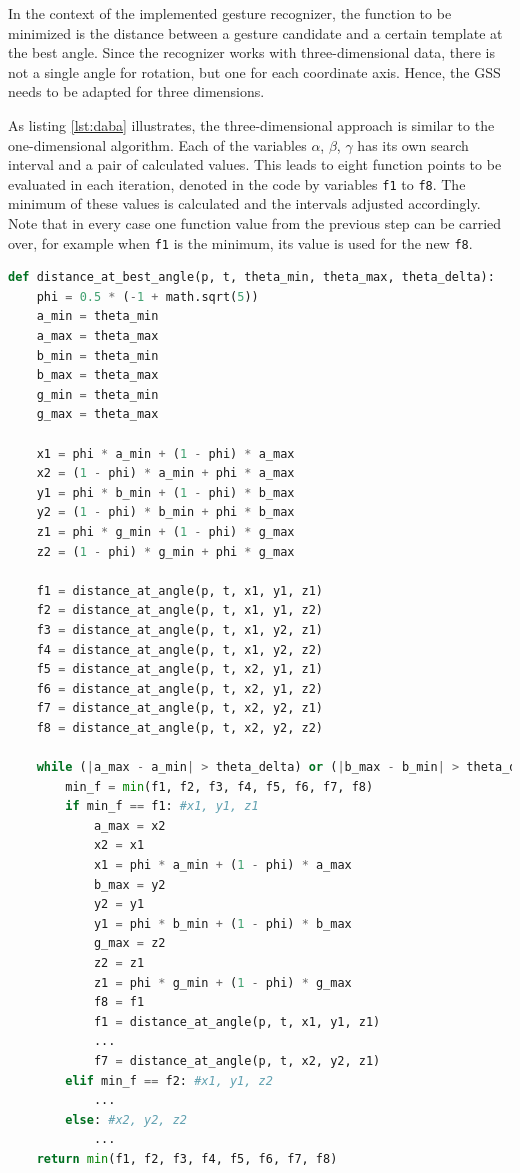 In the context of the implemented gesture recognizer, the function to be minimized is the distance between a gesture candidate and a certain template at the best angle. Since the recognizer works with three-dimensional data, there is not a single angle for rotation, but one for each coordinate axis. Hence, the \ac{GSS} needs to be adapted for three dimensions.

As listing \ref{lst:daba} illustrates, the three-dimensional approach is similar to the one-dimensional algorithm. Each of the variables $\alpha$, $\beta$, $\gamma$ has its own search interval and a pair of calculated values. This leads to eight function points to be evaluated in each iteration, denoted in the code by variables \texttt{f1} to \texttt{f8}. The minimum of these values is calculated and the intervals adjusted accordingly. Note that in every case one function value from the previous step can be carried over, for example when \texttt{f1} is the minimum, its value is used for the new \texttt{f8}.

\begin{lstlisting}[label=lst:daba,language=python,frame=lt,caption=Three-dimensional Golden Section Search for finding the best angle between a candidate gesture and a template]
def distance_at_best_angle(p, t, theta_min, theta_max, theta_delta):
	phi = 0.5 * (-1 + math.sqrt(5))
	a_min = theta_min
	a_max = theta_max
	b_min = theta_min
	b_max = theta_max
	g_min = theta_min
	g_max = theta_max

	x1 = phi * a_min + (1 - phi) * a_max
	x2 = (1 - phi) * a_min + phi * a_max
	y1 = phi * b_min + (1 - phi) * b_max
	y2 = (1 - phi) * b_min + phi * b_max
	z1 = phi * g_min + (1 - phi) * g_max
	z2 = (1 - phi) * g_min + phi * g_max	

	f1 = distance_at_angle(p, t, x1, y1, z1)
	f2 = distance_at_angle(p, t, x1, y1, z2)
	f3 = distance_at_angle(p, t, x1, y2, z1)
	f4 = distance_at_angle(p, t, x1, y2, z2)
	f5 = distance_at_angle(p, t, x2, y1, z1)
	f6 = distance_at_angle(p, t, x2, y1, z2)
	f7 = distance_at_angle(p, t, x2, y2, z1)
	f8 = distance_at_angle(p, t, x2, y2, z2)

	while (|a_max - a_min| > theta_delta) or (|b_max - b_min| > theta_delta) or (|g_max - g_min| > theta_delta):	
		min_f = min(f1, f2, f3, f4, f5, f6, f7, f8)
		if min_f == f1: #x1, y1, z1
			a_max = x2
			x2 = x1
			x1 = phi * a_min + (1 - phi) * a_max
			b_max = y2
			y2 = y1
			y1 = phi * b_min + (1 - phi) * b_max
			g_max = z2
			z2 = z1
			z1 = phi * g_min + (1 - phi) * g_max
			f8 = f1
			f1 = distance_at_angle(p, t, x1, y1, z1)
			...
			f7 = distance_at_angle(p, t, x2, y2, z1)
		elif min_f == f2: #x1, y1, z2
			...
		else: #x2, y2, z2
			...
	return min(f1, f2, f3, f4, f5, f6, f7, f8)
\end{lstlisting}

